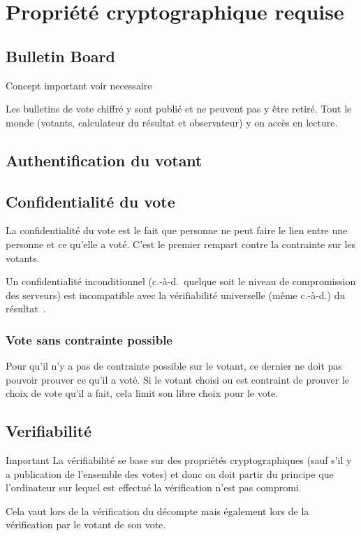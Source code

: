 \documentclass[../report]{subfiles}
\begin{document}
\chapter{Propriété cryptographique requise}
\section{Bulletin Board}
Concept important voir necessaire~\cite{gharadaghy_verifiability_2010}

Les bulletins de vote chiffré y sont publié et ne peuvent pas y être retiré.
Tout le monde (votants, calculateur du résultat et observateur) y on accès en lecture.
\todo{}
\section{Authentification du votant}
\todo{}
\section{Confidentialité du vote}
La confidentialité du vote est le fait que personne ne peut faire le lien entre une personne
et ce qu'elle a voté.
C'est le premier rempart contre la contrainte sur les votants.

Un confidentialité inconditionnel (c.-à-d.\ quelque soit le niveau de compromission des serveurs)
est incompatible avec la vérifiabilité universelle (même c.-à-d.) du 
résultat~\cite{chevallier-mames_incompatible_2010,gharadaghy_verifiability_2010}.
\todo{}

\subsection{Vote sans contrainte possible}

Pour qu'il n'y a pas de contrainte possible sur le votant, ce dernier ne doit pas pouvoir prouver
ce qu'il a voté. 
Si le votant choisi ou est contraint de prouver le choix de vote qu'il a fait, cela limit
son libre choix pour le vote.
\todo{}

\section{Verifiabilité}

\begin{important}{Important}
  La vérifiabilité se base sur des propriétés cryptographiques (sauf s'il y a publication 
  de l'ensemble des votes) et donc on doit partir du principe que l'ordinateur sur lequel 
  est effectué la vérification n'est pas compromi.

  Cela vaut lors de la vérification du décompte mais également 
  lors de la vérification par le votant de son vote.
\end{important}
\todo{}
\end{document}

